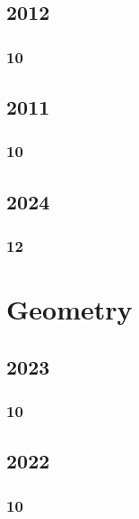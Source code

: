 \documentclass[11pt]{book}
\begin{document}
\section{2012}
\subsection{10}


\section{2011}
\subsection{10}



\section{2024}
\subsection{12}


%

\chapter{Geometry}
\section{2023}
\subsection{10}


\section{2022}
\subsection{10}

\end{document}
